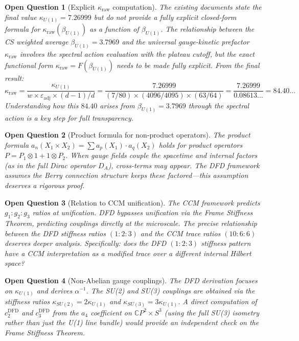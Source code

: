 \documentclass[12pt,a4paper]{article}
\newtheorem{gap}{Open Question}
\begin{document}
\begin{gap}[Explicit $\kappa_{\mathrm{raw}}$ computation]
The existing documents state the final value $\kappa_{U(1)} = 7.26999$ but
do not provide a fully explicit closed-form formula for
$\kappa_{\mathrm{raw}}(\beta_{U(1)})$ as a function of $\beta_{U(1)}$.
The relationship between the CS weighted average $\beta_{U(1)} = 3.7969$
and the universal gauge-kinetic prefactor $\kappa_{\mathrm{raw}}$
involves the spectral action evaluation with the plateau cutoff, but the
exact functional form $\kappa_{\mathrm{raw}} = F(\beta_{U(1)})$ needs
to be made fully explicit.  From the final result:
\begin{equation}
\kappa_{\mathrm{raw}} = \frac{\kappa_{U(1)}}{w \times \varepsilon_{\mathrm{adj}}
\times (d-1)/d}
= \frac{7.26999}{(7/80) \times (4096/4095) \times (63/64)}
= \frac{7.26999}{0.08613\ldots} = 84.40\ldots
\end{equation}
Understanding how this $84.40$ arises from $\beta_{U(1)} = 3.7969$ through
the spectral action is a key step for full transparency.
\end{gap}

\begin{gap}[Product formula for non-product operators]
The product formula $a_n(X_1 \times X_2) = \sum a_p(X_1) \cdot a_q(X_2)$
holds for \emph{product} operators $P = P_1 \otimes 1 + 1 \otimes P_2$.
When gauge fields couple the spacetime and internal factors (as in the
full Dirac operator $D_A$), cross-terms may appear.  The DFD framework
assumes the Berry connection structure keeps these factored---this
assumption deserves a rigorous proof.
\end{gap}

\begin{gap}[Relation to CCM unification]
The CCM framework predicts $g_1 : g_2 : g_3$ ratios at unification.
DFD bypasses unification via the Frame Stiffness Theorem, predicting
couplings directly at the microscale.  The precise relationship between
the DFD stiffness ratios $(1:2:3)$ and the CCM trace ratios $(10:6:6)$
deserves deeper analysis.  Specifically: does the DFD $(1:2:3)$ stiffness
pattern have a CCM interpretation as a modified trace over a different
internal Hilbert space?
\end{gap}

\begin{gap}[Non-Abelian gauge couplings]
The DFD derivation focuses on $\kappa_{U(1)}$ and derives $\alpha^{-1}$.
The SU(2) and SU(3) couplings are obtained via the stiffness ratios
$\kappa_{SU(2)} = 2\kappa_{U(1)}$ and $\kappa_{SU(3)} = 3\kappa_{U(1)}$.
A direct computation of $c_2^{\mathrm{DFD}}$ and $c_3^{\mathrm{DFD}}$
from the $a_4$ coefficient on $\mathbb{C}P^2 \times S^3$ (using the
full SU(3) isometry rather than just the U(1) line bundle) would provide
an independent check on the Frame Stiffness Theorem.
\end{gap}
\end{document}
